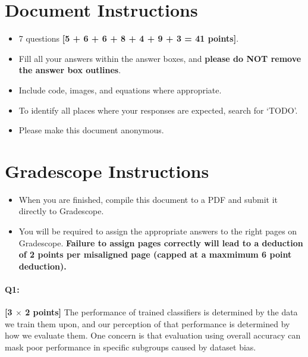 \maketitle
\thispagestyle{fancy}
\vspace{-3cm}

\section*{Document Instructions}
\begin{itemize}
  \item 7 questions \textbf{[5 + 6 + 6 + 8 + 4 + 9 + 3 = 41 points]}.
  \item Fill all your answers within the answer boxes, and \textbf{please do NOT remove the answer box outlines}.
  \item Include code, images, and equations where appropriate.
  \item To identify all places where your responses are expected, search for `TODO'.
  \item Please make this document anonymous.
\end{itemize}

\section*{ Gradescope Instructions}
\begin{itemize}
  \item When you are finished, compile this document to a PDF and submit it directly to Gradescope. 
  \item You will be required to assign the appropriate answers to the right pages on Gradescope. \textbf{Failure to assign pages correctly will lead to a deduction of 2 points per misaligned page (capped at a maxmimum 6 point deduction).}
\end{itemize}
\pagebreak


\paragraph{Q1:} \textbf{[3 $\times$ 2 points]} The performance of trained classifiers is determined by the data we train them upon, and our perception of that performance is determined by how we evaluate them. One concern is that evaluation using overall accuracy can mask poor performance in specific subgroups caused by dataset bias.

